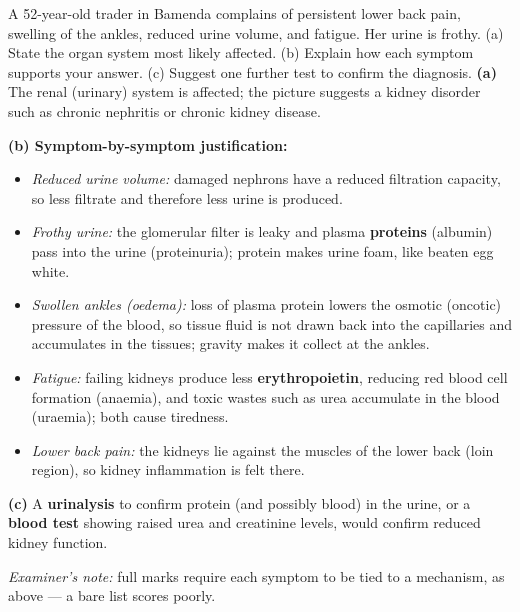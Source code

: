 \documentclass[11pt]{article}
\newcommand{\cle}[1]{{\popxbold\color{popdark}#1}}
\begin{document}
\begin{exoresolu}
A 52-year-old trader in Bamenda complains of persistent lower back pain, swelling of the ankles, reduced urine volume, and fatigue. Her urine is frothy. (a) State the organ system most likely affected. (b) Explain how each symptom supports your answer. (c) Suggest one further test to confirm the diagnosis.
\tcblower
\textbf{(a)} The \cle{renal (urinary) system} is affected; the picture suggests a kidney disorder such as chronic nephritis or chronic kidney disease.

\textbf{(b) Symptom-by-symptom justification:}
\begin{itemize}
\item \emph{Reduced urine volume:} damaged nephrons have a reduced filtration capacity, so less filtrate and therefore less urine is produced.
\item \emph{Frothy urine:} the glomerular filter is leaky and plasma \textbf{proteins} (albumin) pass into the urine (proteinuria); protein makes urine foam, like beaten egg white.
\item \emph{Swollen ankles (oedema):} loss of plasma protein lowers the osmotic (oncotic) pressure of the blood, so tissue fluid is not drawn back into the capillaries and accumulates in the tissues; gravity makes it collect at the ankles.
\item \emph{Fatigue:} failing kidneys produce less \textbf{erythropoietin}, reducing red blood cell formation (anaemia), and toxic wastes such as urea accumulate in the blood (uraemia); both cause tiredness.
\item \emph{Lower back pain:} the kidneys lie against the muscles of the lower back (loin region), so kidney inflammation is felt there.
\end{itemize}
\textbf{(c)} A \textbf{urinalysis} to confirm protein (and possibly blood) in the urine, or a \textbf{blood test} showing raised urea and creatinine levels, would confirm reduced kidney function.

\emph{Examiner's note:} full marks require each symptom to be tied to a mechanism, as above — a bare list scores poorly.
\end{exoresolu}
\end{document}
